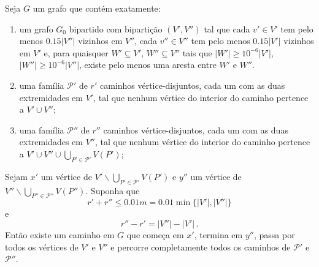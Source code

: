\begin{lema}
	Seja $G$ um grafo que contém exatamente:
	\begin{enumerate}
		\item \label{item:regularidade}um grafo $G_0$ bipartido com bipartição $(V',V'')$ tal que cada $v'\in V'$ tem pelo menos $0.15|V''|$ vizinhos em $V''$, cada $v''\in V''$ tem pelo menos $0.15|V'|$ vizinhos em $V'$ e, para quaisquer $W'\subseteq V'$, $W''\subseteq V''$ tais que $|W'|\geq10^{-6}|V'|$, $|W''|\geq10^{-6}|V''|$, existe pelo menos uma aresta entre $W'$ e $W''$.
		\item uma família $\mathcal{P}'$ de $r'$ caminhos vértice-disjuntos, cada um com as duas extremidades em $V'$, tal que nenhum vértice do interior do caminho pertence a $V'\cup V''$;
		\item uma família $\mathcal{P}''$ de $r''$ caminhos vértice-disjuntos, cada um com as duas extremidades em $V''$, tal que nenhum vértice do interior do caminho pertence a $V'\cup V''\cup \bigcup_{P'\in \mathcal{P}'}V(P')$;
	\end{enumerate}
	Sejam $x'$ um vértice de $V'\backslash \bigcup_{P'\in \mathcal{P}'}V(P')$ e $y''$ um vértice de $V''\backslash \bigcup_{P''\in \mathcal{P}''}V(P'')$. Suponha que 
	\[
	r' + r''\leq 0.01m = 0.01\min\{|V'|, |V''|\}
	\]
	e 
	\[
	r'' - r' = |V''| - |V'|\,. 
	\]
	Então existe um caminho em $G$ que começa em $x'$, termina em $y''$, passa por todos os vértices de $V'$ e $V''$ e percorre completamente todos os caminhos de $\mathcal{P}'$ e $\mathcal{P}''$. 
\end{lema}

